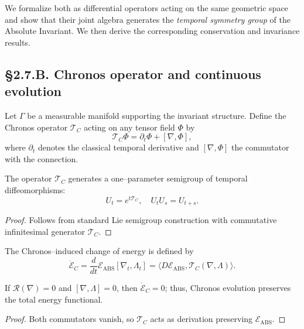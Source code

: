 We formalize both as differential operators acting on the same geometric space and show that their joint algebra generates the \emph{temporal symmetry group} of the Absolute Invariant.
We then derive the corresponding conservation and invariance results.

\subsection*{§2.7.B. Chronos operator and continuous evolution}

\begin{definition}
Let $\Gamma$ be a measurable manifold supporting the invariant structure.
Define the Chronos operator $\mathcal{T}_C$ acting on any tensor field $\Phi$ by
\[
\mathcal{T}_C\Phi = \partial_t\Phi + [\nabla,\Phi],
\]
where $\partial_t$ denotes the classical temporal derivative and $[\nabla,\Phi]$ the commutator with the connection.
\]
\end{definition}

\begin{lemma}
The operator $\mathcal{T}_C$ generates a one–parameter semigroup of temporal diffeomorphisms:
\[
U_t = e^{t\mathcal{T}_C},\quad U_t U_s = U_{t+s}.
\]
\]
\end{lemma}

\begin{proof}
Follows from standard Lie semigroup construction with commutative infinitesimal generator $\mathcal{T}_C$.
\end{proof}

\begin{definition}
The Chronos–induced change of energy is defined by
\[
\dot{\mathcal{E}}_C = \frac{d}{dt}\mathcal{E}_{\mathrm{ABS}}[\nabla_t,\Lambda_t]
= \langle D\mathcal{E}_{\mathrm{ABS}}, \mathcal{T}_C(\nabla,\Lambda)\rangle.
\]
\]
\end{definition}

\begin{theorem}\label{thm:2.7.chronos}
If $\mathcal{R}(\nabla)=0$ and $[\nabla,\Lambda]=0$, then $\dot{\mathcal{E}}_C=0$;  
thus, Chronos evolution preserves the total energy functional.
\end{theorem}

\begin{proof}
Both commutators vanish, so $\mathcal{T}_C$ acts as derivation preserving $\mathcal{E}_{\mathrm{ABS}}$.
\end{proof}

